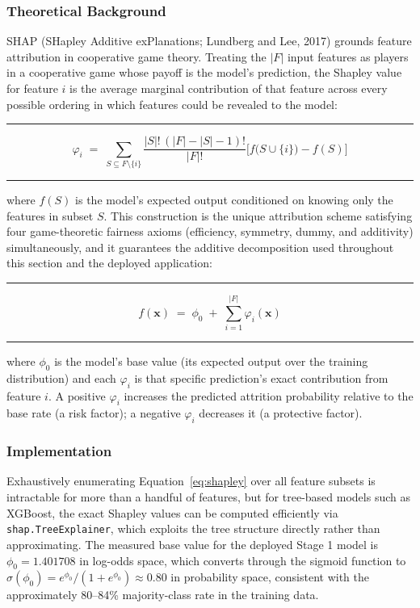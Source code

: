 \documentclass[11pt,a4paper]{article}
\newcommand{\code}[1]{\texttt{\footnotesize #1}}
\newenvironment{formulabox}
  {\begin{center}\color{TPteal}\rule{0.92\linewidth}{0.8pt}\par\vspace{5pt}\color{TPnavy}}
  {\par\vspace{3pt}\color{TPteal}\rule{0.92\linewidth}{0.8pt}\end{center}}
\begin{document}
\subsubsection{Theoretical Background}

SHAP (SHapley Additive exPlanations; Lundberg and Lee, 2017) grounds feature attribution in cooperative game theory. Treating the $|F|$ input features as players in a cooperative game whose payoff is the model's prediction, the Shapley value for feature $i$ is the average marginal contribution of that feature across every possible ordering in which features could be revealed to the model:

\begin{formulabox}
\begin{equation}
\label{eq:shapley}
\varphi_i \;=\; \sum_{S \subseteq F \setminus \{i\}} \frac{|S|!\,(|F|-|S|-1)!}{|F|!} \Big[ f\big(S \cup \{i\}\big) - f(S) \Big]
\end{equation}
\end{formulabox}

where $f(S)$ is the model's expected output conditioned on knowing only the features in subset $S$. This construction is the unique attribution scheme satisfying four game-theoretic fairness axioms (efficiency, symmetry, dummy, and additivity) simultaneously, and it guarantees the additive decomposition used throughout this section and the deployed application:

\begin{formulabox}
\begin{equation}
\label{eq:shap-additive}
f(\mathbf{x}) \;=\; \phi_0 \;+\; \sum_{i=1}^{|F|} \varphi_i(\mathbf{x})
\end{equation}
\end{formulabox}

where $\phi_0$ is the model's base value (its expected output over the training distribution) and each $\varphi_i$ is that specific prediction's exact contribution from feature $i$. A positive $\varphi_i$ increases the predicted attrition probability relative to the base rate (a risk factor); a negative $\varphi_i$ decreases it (a protective factor).

\subsubsection{Implementation}

Exhaustively enumerating Equation~\ref{eq:shapley} over all feature subsets is intractable for more than a handful of features, but for tree-based models such as XGBoost, the exact Shapley values can be computed efficiently via \code{shap.TreeExplainer}, which exploits the tree structure directly rather than approximating. The measured base value for the deployed Stage 1 model is $\phi_0 = 1.401708$ in log-odds space, which converts through the sigmoid function to $\sigma(\phi_0) = e^{\phi_0}/(1+e^{\phi_0}) \approx 0.80$ in probability space, consistent with the approximately 80--84\% majority-class rate in the training data.
\end{document}
